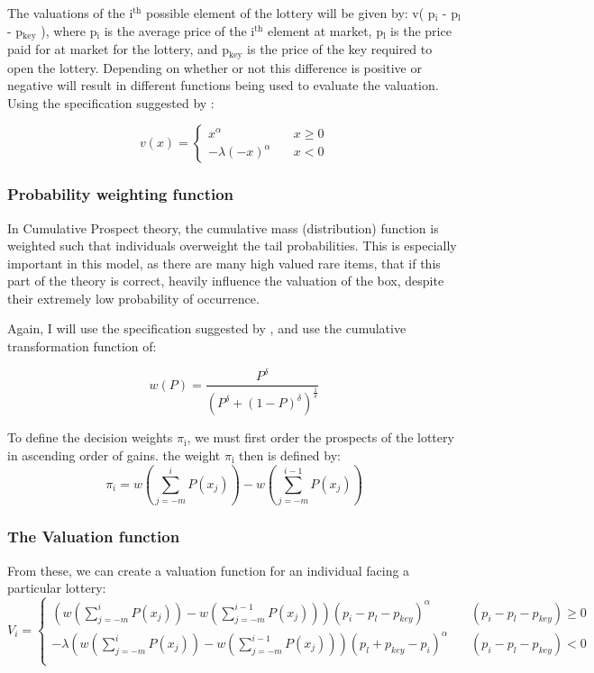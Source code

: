 \documentclass[11pt]{article}
\begin{document}
The valuations of the i$^{\text{th}}$ possible element of the lottery will be
given by: v( p$_{\text{i}}$ - p$_{\text{l}}$ - p$_{\text{key}}$ ), where p$_{\text{i}}$ is the average price of the
i$^{\text{th}}$ element at market, p$_{\text{l}}$ is the price paid for at market for the
lottery, and p$_{\text{key}}$ is the price of the key required to open the
lottery. Depending on whether or not this difference is positive or
negative will result in different functions being used to evaluate the
valuation. Using the specification suggested by \cite{Kahn}:

$$v(x) = \begin{cases} x^\alpha \quad &x \geq 0\\ -\lambda(-x)^\alpha \quad &x < 0 \end{cases}$$

\subsubsection{Probability weighting function}
\label{sec-2-3-2}

In Cumulative Prospect theory, the cumulative mass (distribution)
function is weighted such that individuals overweight the tail
probabilities. This is especially important in this model, as there are
many high valued rare items, that if this part of the theory is
correct, heavily influence the valuation of the box, despite their
extremely low probability of occurrence.

Again, I will use the specification suggested by \cite{Kahn}, and use
the cumulative transformation function of: 

$$w(P) = \frac{ P^\delta }{( P^\delta + (1-P)^\delta )^{\frac{1}{\delta}}}$$

To define the decision weights $\pi$$_{\text{i}}$, we must first order the prospects
of the lottery in ascending order of gains. the weight $\pi$$_{\text{i}}$ then is
defined by: 
$$\pi_i = w( \sum_{j = -m}^i P(x_j)) - w( \sum_{j=-m}^{i-1} P(x_j) )$$

\subsubsection{The Valuation function}
\label{sec-2-3-3}

From these, we can create a valuation function for an individual
facing a particular lottery: 
$$V_i = \begin{cases}
(w( \sum_{j = -m}^i P(x_j)) - w( \sum_{j=-m}^{i-1} P(x_j) ))(p_i - p_l - p_{key})^\alpha \quad &(p_i - p_l - p_{key}) \geq 0 \\
-\lambda(w( \sum_{j = -m}^i P(x_j)) - w( \sum_{j=-m}^{i-1} P(x_j) ))(p_l + p_{key} - p_i)^\alpha \quad &(p_i - p_l - p_{key}) < 0 \\
\end{cases}$$
\end{document}
